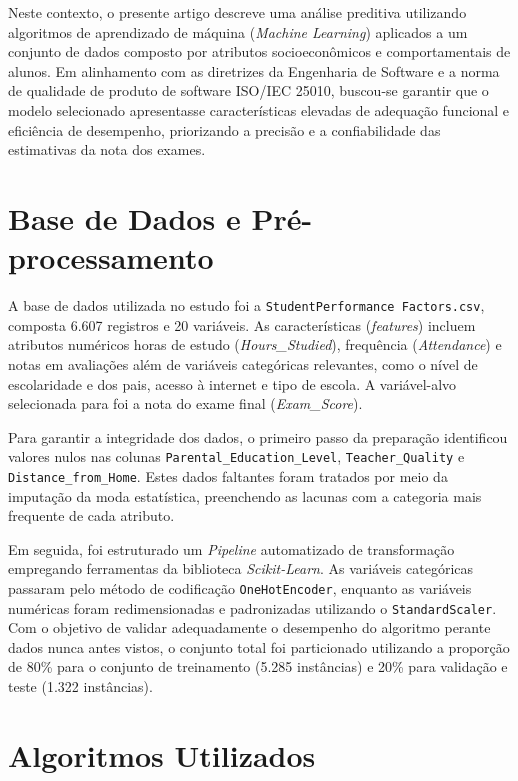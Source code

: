\documentclass[12pt]{article}
\begin{document}
Neste contexto, o presente artigo descreve uma análise preditiva utilizando algoritmos de aprendizado de máquina (\textit{Machine Learning}) aplicados a um conjunto de dados composto por atributos socioeconômicos e comportamentais de alunos. Em alinhamento com as diretrizes da Engenharia de Software e a norma de qualidade de produto de software ISO/IEC 25010, buscou-se garantir que o modelo selecionado apresentasse características elevadas de adequação funcional e eficiência de desempenho, priorizando a precisão e a confiabilidade das estimativas da nota dos exames.

\section{Base de Dados e Pré-processamento}

A base de dados utilizada no estudo foi a \texttt{StudentPerformance Factors.csv}, composta 6.607 registros e 20 variáveis. As características (\textit{features}) incluem atributos numéricos horas de estudo (\textit{Hours\_Studied}), frequência (\textit{Attendance}) e notas em avaliações além de variáveis categóricas relevantes, como o nível de escolaridade e dos pais, acesso à internet e tipo de escola. A variável-alvo selecionada para foi a nota do exame final (\textit{Exam\_Score}).

Para garantir a integridade dos dados, o primeiro passo da preparação identificou valores nulos nas colunas \texttt{Parental\_Education\_Level}, \texttt{Teacher\_Quality} e \texttt{Distance\_from\_Home}. Estes dados faltantes foram tratados por meio da imputação da moda estatística, preenchendo as lacunas com a categoria mais frequente de cada atributo.

Em seguida, foi estruturado um \textit{Pipeline} automatizado de transformação empregando ferramentas da biblioteca \textit{Scikit-Learn}. As variáveis categóricas passaram pelo método de codificação \texttt{OneHotEncoder}, enquanto as variáveis numéricas foram redimensionadas e padronizadas utilizando o \texttt{StandardScaler}. Com o objetivo de validar adequadamente o desempenho do algoritmo perante dados nunca antes vistos, o conjunto total foi particionado utilizando a proporção de 80\% para o conjunto de treinamento (5.285 instâncias) e 20\% para validação e teste (1.322 instâncias).

\section{Algoritmos Utilizados}
\end{document}
